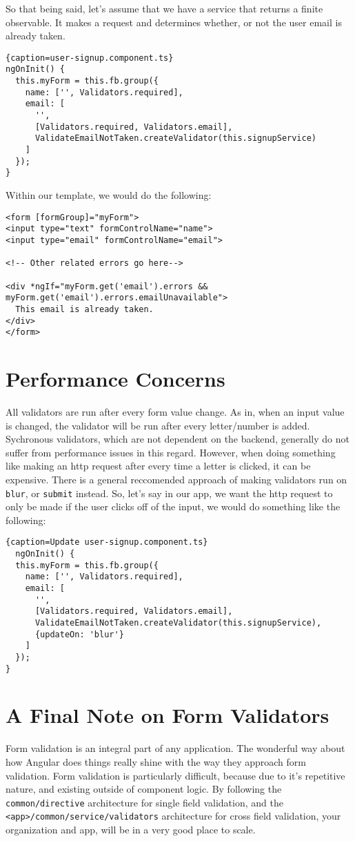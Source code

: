 So that being said, let's assume that we have a service that returns a
finite observable. It makes a request and determines whether, or not the user
email is already taken.
\begin{lstlisting}{caption=user-signup.component.ts}
ngOnInit() {
  this.myForm = this.fb.group({
    name: ['', Validators.required],
    email: [
      '',
      [Validators.required, Validators.email],
      ValidateEmailNotTaken.createValidator(this.signupService)
    ]
  });
}
\end{lstlisting}

Within our template, we would do the following: 
\begin{lstlisting}[caption=user-signup.component.html]
<form [formGroup]="myForm">
<input type="text" formControlName="name">
<input type="email" formControlName="email">

<!-- Other related errors go here-->

<div *ngIf="myForm.get('email').errors && myForm.get('email').errors.emailUnavailable">
  This email is already taken. 
</div>
</form>  
\end{lstlisting}

\section{ Performance Concerns }
All validators are run after every form value change. As in, when an input 
value is changed, the validator will be run after every letter/number is added. 
Sychronous validators, which are not dependent on the backend, generally do 
not suffer from performance issues in this regard. However, when doing 
something like making an http request after every time a letter is clicked, it 
can be expensive. There is a general reccomended approach of making validators 
run on \lstinline{blur}, or \lstinline{submit} instead. So, let's say in our 
app, we want the http request to only be made if the user clicks off of the 
input, we would do something like the following: 

\begin{lstlisting}{caption=Update user-signup.component.ts}
  ngOnInit() {
  this.myForm = this.fb.group({
    name: ['', Validators.required],
    email: [
      '',
      [Validators.required, Validators.email],
      ValidateEmailNotTaken.createValidator(this.signupService),
      {updateOn: 'blur'}
    ]
  });
}
\end{lstlisting}

\section{A Final Note on Form Validators}
Form validation is an integral part of any application. The wonderful way 
about how Angular does things really shine with the way they approach form 
validation. Form validation is particularly difficult, because due to it's 
repetitive nature, and existing outside of component logic. By following 
the \lstinline{common/directive} architecture for single field validation, and
the \lstinline{<app>/common/service/validators} architecture for cross field 
validation, your organization and app, will be in a very good place to scale.
